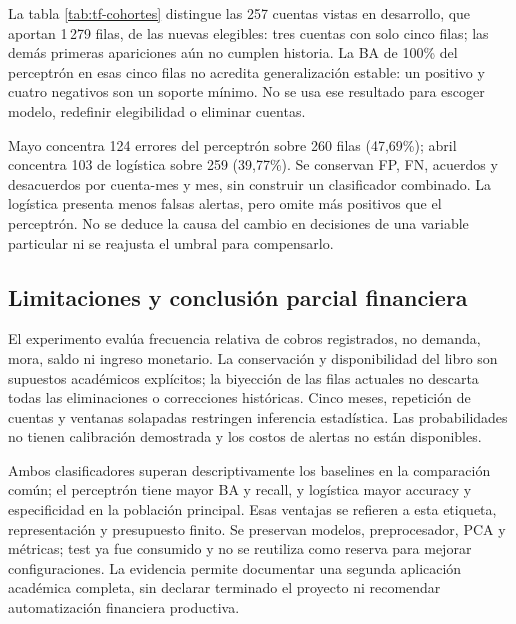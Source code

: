 
La tabla \ref{tab:tf-cohortes} distingue las 257 cuentas vistas en desarrollo, que aportan 1\,279 filas, de las nuevas elegibles: tres cuentas con solo cinco filas; las demás primeras apariciones aún no cumplen historia. La BA de 100\% del perceptrón en esas cinco filas no acredita generalización estable: un positivo y cuatro negativos son un soporte mínimo. No se usa ese resultado para escoger modelo, redefinir elegibilidad o eliminar cuentas.

Mayo concentra 124 errores del perceptrón sobre 260 filas (47,69\%); abril concentra 103 de logística sobre 259 (39,77\%). Se conservan FP, FN, acuerdos y desacuerdos por cuenta-mes y mes, sin construir un clasificador combinado. La logística presenta menos falsas alertas, pero omite más positivos que el perceptrón. No se deduce la causa del cambio en decisiones de una variable particular ni se reajusta el umbral para compensarlo.

\subsection{Limitaciones y conclusión parcial financiera}
El experimento evalúa frecuencia relativa de cobros registrados, no demanda, mora, saldo ni ingreso monetario. La conservación y disponibilidad del libro son supuestos académicos explícitos; la biyección de las filas actuales no descarta todas las eliminaciones o correcciones históricas. Cinco meses, repetición de cuentas y ventanas solapadas restringen inferencia estadística. Las probabilidades no tienen calibración demostrada y los costos de alertas no están disponibles.

Ambos clasificadores superan descriptivamente los baselines en la comparación común; el perceptrón tiene mayor BA y recall, y logística mayor accuracy y especificidad en la población principal. Esas ventajas se refieren a esta etiqueta, representación y presupuesto finito. Se preservan modelos, preprocesador, PCA y métricas; test ya fue consumido y no se reutiliza como reserva para mejorar configuraciones. La evidencia permite documentar una segunda aplicación académica completa, sin declarar terminado el proyecto ni recomendar automatización financiera productiva.
